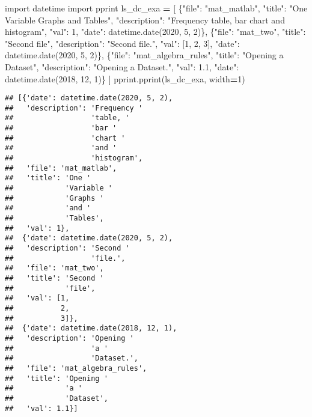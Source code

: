 \documentclass[
]{book}
\newenvironment{Shaded}{\begin{snugshade}}{\end{snugshade}}
\newcommand{\DecValTok}[1]{\textcolor[rgb]{0.00,0.00,0.81}{#1}}
\newcommand{\FloatTok}[1]{\textcolor[rgb]{0.00,0.00,0.81}{#1}}
\newcommand{\ImportTok}[1]{#1}
\newcommand{\NormalTok}[1]{#1}
\newcommand{\OperatorTok}[1]{\textcolor[rgb]{0.81,0.36,0.00}{\textbf{#1}}}
\newcommand{\StringTok}[1]{\textcolor[rgb]{0.31,0.60,0.02}{#1}}
\begin{document}
\begin{Shaded}
\begin{Highlighting}[]
\ImportTok{import}\NormalTok{ datetime}
\ImportTok{import}\NormalTok{ pprint}
\NormalTok{ls\_dc\_exa }\OperatorTok{=}\NormalTok{  [}
\NormalTok{    \{}\StringTok{"file"}\NormalTok{: }\StringTok{"mat\_matlab"}\NormalTok{,}
     \StringTok{"title"}\NormalTok{: }\StringTok{"One Variable Graphs and Tables"}\NormalTok{,}
     \StringTok{"description"}\NormalTok{: }\StringTok{"Frequency table, bar chart and histogram"}\NormalTok{,}
     \StringTok{"val"}\NormalTok{: }\DecValTok{1}\NormalTok{,}
     \StringTok{"date"}\NormalTok{: datetime.date(}\DecValTok{2020}\NormalTok{, }\DecValTok{5}\NormalTok{, }\DecValTok{2}\NormalTok{)\},}
\NormalTok{    \{}\StringTok{"file"}\NormalTok{: }\StringTok{"mat\_two"}\NormalTok{,}
     \StringTok{"title"}\NormalTok{: }\StringTok{"Second file"}\NormalTok{,}
     \StringTok{"description"}\NormalTok{: }\StringTok{"Second file."}\NormalTok{,}
     \StringTok{"val"}\NormalTok{: [}\DecValTok{1}\NormalTok{, }\DecValTok{2}\NormalTok{, }\DecValTok{3}\NormalTok{],}
     \StringTok{"date"}\NormalTok{: datetime.date(}\DecValTok{2020}\NormalTok{, }\DecValTok{5}\NormalTok{, }\DecValTok{2}\NormalTok{)\},}
\NormalTok{    \{}\StringTok{"file"}\NormalTok{: }\StringTok{"mat\_algebra\_rules"}\NormalTok{,}
     \StringTok{"title"}\NormalTok{: }\StringTok{"Opening a Dataset"}\NormalTok{,}
     \StringTok{"description"}\NormalTok{: }\StringTok{"Opening a Dataset."}\NormalTok{,}
     \StringTok{"val"}\NormalTok{: }\FloatTok{1.1}\NormalTok{,}
     \StringTok{"date"}\NormalTok{: datetime.date(}\DecValTok{2018}\NormalTok{, }\DecValTok{12}\NormalTok{, }\DecValTok{1}\NormalTok{)\}}
\NormalTok{]}
\NormalTok{pprint.pprint(ls\_dc\_exa, width}\OperatorTok{=}\DecValTok{1}\NormalTok{)}
\end{Highlighting}
\end{Shaded}

\begin{verbatim}
## [{'date': datetime.date(2020, 5, 2),
##   'description': 'Frequency '
##                  'table, '
##                  'bar '
##                  'chart '
##                  'and '
##                  'histogram',
##   'file': 'mat_matlab',
##   'title': 'One '
##            'Variable '
##            'Graphs '
##            'and '
##            'Tables',
##   'val': 1},
##  {'date': datetime.date(2020, 5, 2),
##   'description': 'Second '
##                  'file.',
##   'file': 'mat_two',
##   'title': 'Second '
##            'file',
##   'val': [1,
##           2,
##           3]},
##  {'date': datetime.date(2018, 12, 1),
##   'description': 'Opening '
##                  'a '
##                  'Dataset.',
##   'file': 'mat_algebra_rules',
##   'title': 'Opening '
##            'a '
##            'Dataset',
##   'val': 1.1}]
\end{verbatim}
\end{document}
